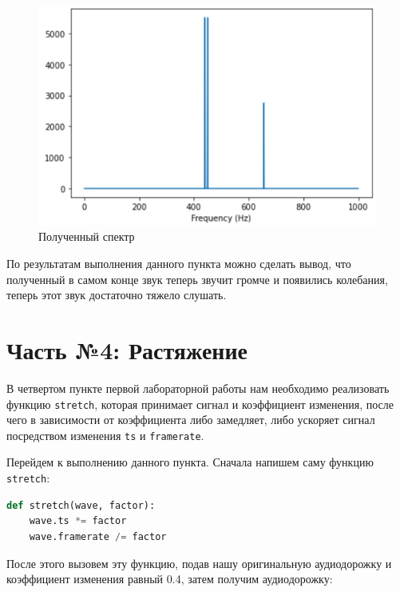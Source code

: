 \documentclass[a4paper]{article}
\begin{document}
            \begin{figure}[H]
                \centering
                \includegraphics[width=\textwidth]{spectr_sum_add_result.png}
                \caption{Полученный спектр}
                \label{fig:spectr_sum_add_result}
            \end{figure}
            
            По результатам выполнения данного пункта можно сделать вывод, что полученный в самом конце звук теперь звучит громче и появились колебания, теперь этот звук достаточно тяжело слушать.
            
    \newpage
        \section{Часть №4: Растяжение}
            В четвертом пункте первой лабораторной работы нам необходимо реализовать функцию \texttt{stretch}, которая принимает сигнал и коэффициент изменения, после чего в зависимости от коэффициента либо замедляет, либо ускоряет сигнал посредством изменения \texttt{ts} и \texttt{framerate}.
            
            Перейдем к выполнению данного пункта. Сначала напишем саму функцию \texttt{stretch}:
            
\begin{lstlisting}[language=Python, caption= Функция \texttt{stretch}]
    def stretch(wave, factor):
    wave.ts *= factor
    wave.framerate /= factor
\end{lstlisting}
            
            После этого вызовем эту функцию, подав нашу оригинальную аудиодорожку и коэффициент изменения равный 0.4, затем получим аудиодорожку:
            
\end{document}
